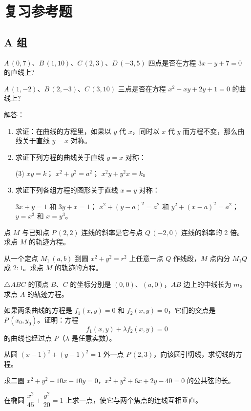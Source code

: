 \chapter*{复习参考题}
\section*{A 组}
\begin{question}
  \item $A\,(0,7)$、$B\,(1,10)$、$C\,(2,3)$、$D\,(-3,5)$ 四点是否在方程 $3x-y+7=0$ 的直线上?
  \item $A\,(1,-2)$、$B\,(2,-3)$、$C\,(3,10)$ 三点是否在方程 $x^2-xy+2y+1=0$ 的曲线上?
  \item 解答：
  \begin{enumerate}[itemindent=2em]
    \item 求证：在曲线的方程里，如果以 $y$ 代 $x$，同时以 $x$ 代 $y$ 而方程不变，那么曲线关于直线 $y=x$ 对称。
    \item 求证下列方程的曲线关于直线 $y=x$ 对称：
    \begin{tasks}(3)
      \task $xy=k$；
      \task $x^2+y^2=a^2$；
      \task $x^2y+y^2x=k$。
    \end{tasks}
    \item 求证下列各组方程的图形关于直线 $x=y$ 对称：
    \begin{tasks}
      \task $3x+y=1$ 和 $3y+x=1$；
      \task $x^2+(y-a)^2=a^2$ 和 $y^2+(x-a)^2=a^2$；
      \task $y=x^3$ 和 $x=y^3$。
    \end{tasks}
  \end{enumerate}
  \item 点 $M$ 与已知点 $P\,(2,2)$ 连线的斜率是它与点 $Q\,(-2,0)$ 连线的斜率的 2 倍。求点 $M$ 的轨迹方程。
  \item 从一个定点 $M_1\,(a,b)$ 到圆 $x^2+y^2=r^2$ 上任意一点 $Q$ 作线段，$M$ 点内分 $M_1Q$ 成 $2:1$。求点 $M$ 的轨迹的方程。
  \item $\triangle ABC$ 的顶点 $B$、$C$ 的坐标分别是 $(0,0)$、$(a,0)$，$AB$ 边上的中线长为 $m$。求点 $A$ 的轨迹方程。
  \item 如果两条曲线的方程是 $f_1(x,y)=0$ 和 $f_2(x,y)=0$，它们的交点是 $P\,(x_0,y_0)$。证明：方程
\[f_1(x,y)+\lambda f_2(x,y)=0\]
的曲线也经过点 $P$（$\lambda$ 是任意实数）。
  \item 从圆 $(x-1)^2+(y-1)^2=1$ 外一点 $P\,(2,3)$，向该圆引切线，求切线的方程。
  \item 求二圆 $x^2+y^2-10x-10y=0$，$x^2+y^2+6x+2y-40=0$ 的公共弦的长。
  \item 在椭圆 $\dfrac{x^2}{45}+\dfrac{y^2}{20}=1$ 上求一点，使它与两个焦点的连线互相垂直。

\end{question}
